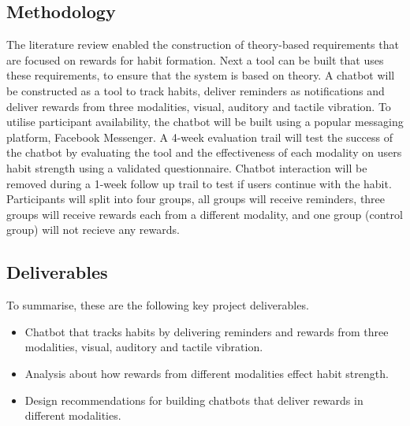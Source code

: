 \subsection*{Methodology}
The literature review enabled the construction of theory-based requirements that are focused on rewards for habit formation. Next a tool can be built that uses these requirements, to ensure that the system is based on theory. A chatbot will be constructed as a tool to track habits, deliver reminders as notifications and deliver rewards from three modalities, visual, auditory and tactile vibration. To utilise participant availability, the chatbot will be built using a popular messaging platform, Facebook Messenger.\newline
\newline
A 4-week evaluation trail will test the success of the chatbot by evaluating the tool and the effectiveness of each modality on users habit strength using a validated questionnaire. Chatbot interaction will be removed during a 1-week follow up trail to test if users continue with the habit. Participants will split into four groups, all groups will receive reminders, three groups will receive rewards each from a different modality, and one group (control group) will not recieve any rewards.

\subsection*{Deliverables}
To summarise, these are the following key project deliverables.

\begin{itemize}
  \item Chatbot that tracks habits by delivering reminders and rewards from three modalities, visual, auditory and tactile vibration.
  \item Analysis about how rewards from different modalities effect habit strength.
  \item Design recommendations for building chatbots that deliver rewards in different modalities.
\end{itemize}

